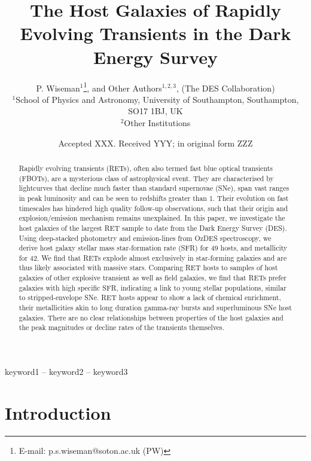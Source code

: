 \documentclass[fleqn,usenatbib,]{mnras}
\title[RET host galaxies in DES]{The Host Galaxies of Rapidly Evolving Transients in the Dark Energy Survey}
\author[P. Wiseman et al.]{
P. Wiseman$^1$\thanks{E-mail: p.s.wiseman@soton.ac.uk (PW)},
 and Other Authors$^{1,2,3}$,
\newauthor
(The DES Collaboration)
\\
$^{1}$School of Physics and Astronomy, University of Southampton, Southampton, SO17 1BJ, UK\\
$^{2}$Other Institutions\\
}
\date{Accepted XXX. Received YYY; in original form ZZZ}
\begin{document}
\label{firstpage}
\pagerange{\pageref{firstpage}--\pageref{lastpage}}
\maketitle

\begin{abstract}
Rapidly evolving transients (RETs), often also termed fast blue optical transients (FBOTs), are a mysterious class of astrophysical event. They are characterised by lightcurves that decline much faster than standard supernovae (SNe), span vast ranges in peak luminosity and can be seen to redshifts greater than 1. Their evolution on fast timescales has hindered high quality follow-up observations, such that their origin and explosion/emission mechanism remains unexplained. In this paper, we investigate the host galaxies of the largest RET sample to date from the Dark Energy Survey (DES). Using deep-stacked photometry and emission-lines from OzDES spectroscopy, we derive host galaxy stellar mass star-formation rate (SFR) for 49 hosts, and metallicity for 42. We find that RETs explode almost exclusively in star-forming galaxies and are thus likely associated with massive stars. Comparing RET hosts to samples of host galaxies of other explosive transient as well as field galaxies, we find that RETs prefer galaxies with high specific SFR, indicating a link to young stellar populations, similar to stripped-envelope SNe. RET hosts appear to show a lack of chemical enrichment, their metallicities akin to long duration gamma-ray bursts and superluminous SNe host galaxies. There are no clear relationships between properties of the host galaxies and the peak magnitudes or decline rates of the transients themselves.

\end{abstract}

\begin{keywords}
keyword1 -- keyword2 -- keyword3
\end{keywords}



\section{Introduction}
\end{document}
